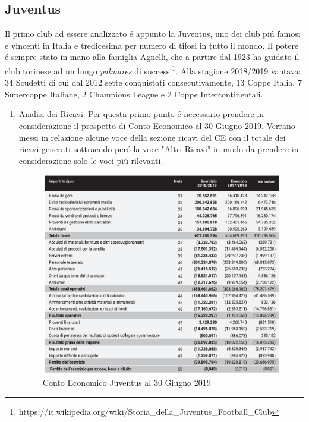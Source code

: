 \documentclass[
    corpo=12pt,
    oneside,
    evenboxes,
    tipotesi=triennale,
    stile=classica,
    oldstyle,
    autoretitolo,
    greek,
]{toptesi}
\begin{document}
\begin{interlinea}{1.5}
\subsection{Juventus}
Il primo club ad essere analizzato \'e appunto la Juventus, uno dei club pi\'u famosi e vincenti in Italia e tredicesima per numero di tifosi 
in tutto il mondo. Il potere \'e sempre stato in mano alla famiglia Agnelli, che a partire dal 1923 ha guidato il club torinese ad un lungo
\emph{palmares} di successi\footnote{https://it.wikipedia.org/wiki/Storia\_della\_Juventus\_Football\_Club}. Alla stagione 2018/2019 vantava: 34 Scudetti di cui dal 2012 sette conquistati consecutivamente, 13
Coppe Italia, 7 Supercoppe Italiane, 2 Champions League e 2 Coppe Intercontinentali.\newline
\begin{enumerate}
    \item Analisi dei Ricavi:\newline
        Per questa primo punto \'e necessario prendere in considerazione il prospetto di Conto Economico al 30 Giugno 2019.
        Verrano messi in relazione alcune voce della sezione ricavi del CE con il totale dei ricavi generati sottraendo per\'o la voce
        "Altri Ricavi" in modo da prendere in considerazione solo le voci pi\'u rilevanti.
        \begin{figure}
            \centering
            \includegraphics[scale=.4]{img/CE_juve.png}
            \caption{Conto Economico Juventus al 30 Giugno 2019}
            \label{ce_juve}
        \end{figure}\newline

\end{enumerate}
\end{interlinea}
\end{document}
